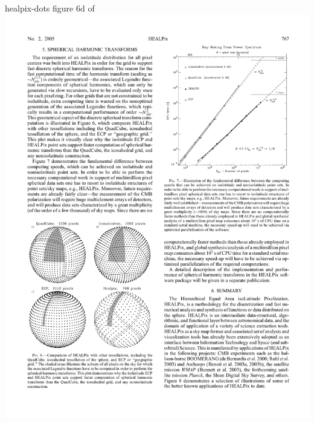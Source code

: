 \documentclass[landscape]{a0poster}
\begin{document}
\begin{staticcontents*}{healpix-dots}
\centering
figure 6d of~\citet{healpix}\\\vspace{5mm}
\includegraphics[width=\textwidth]{healpix-dots}
\end{staticcontents*}
\end{document}
